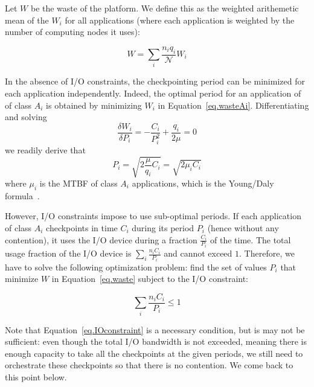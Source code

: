 \documentclass{article}
\newcommand{\nbnodesplat}{{\mathcal N}}
\newcommand{\app}[1]{A_{#1}}
\newcommand{\nbapp}[1]{n_{#1}}
\newcommand{\nbnodes}[1]{q_{#1}}
\newcommand{\period}[1]{P_{#1}}
\newcommand{\ckpt}[1]{C_{#1}}
\newcommand{\wasteapp}[1]{W_{#1}}
\newcommand{\mtbfplat}{\mu}
\newcommand{\wasteplat}{W}
\begin{document}
Let $\wasteplat$ be the waste of the platform. We define this as the
weighted arithemetic mean of the $\wasteapp{i}$ for all applications
(where each application is weighted by the number of computing nodes
it uses):

\begin{equation}
\wasteplat = \sum_i \frac{\nbapp{i} \nbnodes{i}}{\nbnodesplat} \wasteapp{i}
\label{eq.waste}
\end{equation}

In the absence of I/O constraints, the checkpointing period can be minimized
for each application independently. Indeed, the optimal period for an application of 
of class $\app{i}$ is obtained by minimizing $\wasteapp{i}$ in Equation~\eqref{eq.wasteAi}.
Differentiating and solving 
$$\frac{\delta \wasteapp{i}}{\delta \period{i}} = - \frac{\ckpt{i}}{\period{i}^{2}} + \frac{\nbnodes{i}}{2 \mtbfplat} = 0$$
we readily derive that
\begin{equation}
\period{i} = \sqrt{2 \frac{\mtbfplat}{\nbnodes{i}} \ckpt{i}} = \sqrt{2 \mu_{i} \ckpt{i}}
\label{eq.daly}
\end{equation}
where $\mu_{i}$ is the MTBF of  class $\app{i}$ applications, which is the Young/Daly formula~\cite{young74,daly04}.

However, I/O constraints impose to use sub-optimal periods. If each application
of  class $\app{i}$ checkpoints in time $\ckpt{i}$ during its period $\period{i}$ (hence without any contention), it uses the I/O device during a fraction $\frac{\ckpt{i}}{\period{i}}$ of the time.
The total usage fraction of the  I/O device is $\sum_{i} \frac{\nbapp{i} \ckpt{i}}{\period{i}}$
and cannot exceed $1$. Therefore, we have to solve the following optimization problem: find
the set of values $\period{i}$ that minimize $\wasteplat$ in Equation~\eqref{eq.waste} subject to the I/O constraint:

\begin{equation}
\sum_{i} \frac{\nbapp{i} \ckpt{i}}{\period{i}} \leq 1
\label{eq.IOconstraint}
\end{equation}

Note that Equation~\eqref{eq.IOconstraint} is a necessary condition, but is may not be sufficient:
even though the total I/O bandwidth is not exceeded, meaning there is enough capacity to take all the checkpoints at the given periods, we still need to orchestrate these checkpoints so that there is no contention. We come back to this point below.
\end{document}
